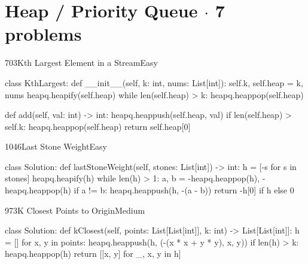 \section{Heap / Priority Queue \texorpdfstring{{\normalsize\color{muted}$\cdot$ 7 problems}}{- 7 problems}}

\begin{problem}{703}{Kth Largest Element in a Stream}{Easy}
\begin{code}
class KthLargest:
    def __init__(self, k: int, nums: List[int]):
        self.k, self.heap = k, nums
        heapq.heapify(self.heap)
        while len(self.heap) > k:
            heapq.heappop(self.heap)

    def add(self, val: int) -> int:
        heapq.heappush(self.heap, val)
        if len(self.heap) > self.k:
            heapq.heappop(self.heap)
        return self.heap[0]
\end{code}
\end{problem}

\begin{problem}{1046}{Last Stone Weight}{Easy}
\begin{code}
class Solution:
    def lastStoneWeight(self, stones: List[int]) -> int:
        h = [-s for s in stones]
        heapq.heapify(h)
        while len(h) > 1:
            a, b = -heapq.heappop(h), -heapq.heappop(h)
            if a != b:
                heapq.heappush(h, -(a - b))
        return -h[0] if h else 0
\end{code}
\end{problem}

\begin{problem}{973}{K Closest Points to Origin}{Medium}
\begin{code}
class Solution:
    def kClosest(self, points: List[List[int]], k: int) -> List[List[int]]:
        h = []
        for x, y in points:
            heapq.heappush(h, (-(x * x + y * y), x, y))
            if len(h) > k:
                heapq.heappop(h)
        return [[x, y] for _, x, y in h]
\end{code}
\end{problem}

